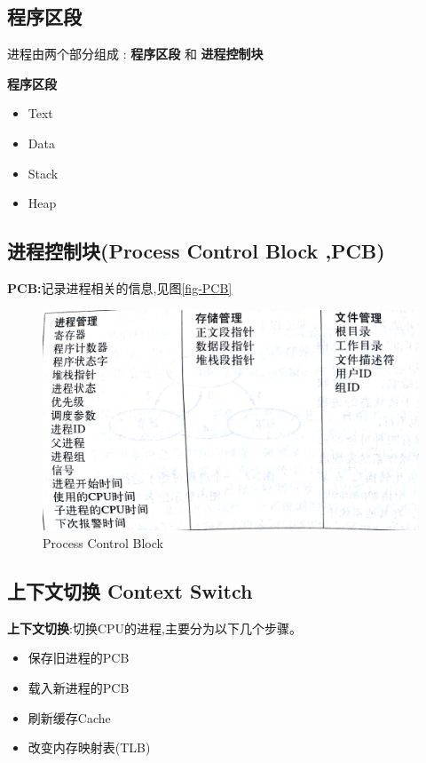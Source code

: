 \documentclass[UTF8,a4paper]{ctexart}
\newcommand{\spaceline}{\vspace{\baselineskip}}
\begin{document}
\spaceline
\subsection{程序区段}
进程由两个部分组成 : \textbf{程序区段} 和 \textbf{进程控制块}

\textbf{程序区段}
\begin{itemize}
	\item Text
	\item Data
	\item Stack
	\item Heap
\end{itemize}

\subsection{进程控制块(Process Control Block ,PCB)}

\textbf{PCB:}记录进程相关的信息,见图\ref{fig-PCB}

\begin{figure}[H]
	\centering
	\includegraphics[scale = 0.1]{assets/ModernOperatingSystems_e6663.png}
	\caption{Process Control Block}
\end{figure}

\subsection{上下文切换 Context Switch}
\textbf{上下文切换}:切换CPU的进程,主要分为以下几个步骤。
\begin{itemize}
	\item 保存旧进程的PCB
	\item 载入新进程的PCB
	\item 刷新缓存Cache
	\item 改变内存映射表(TLB)
\end{itemize}
\end{document}
